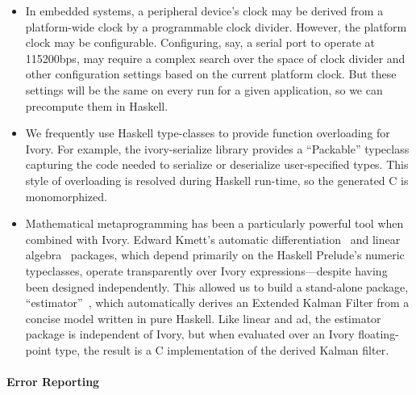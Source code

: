 \begin{itemize}
\item In embedded systems, a peripheral device's clock may be derived from a
  platform-wide clock by a programmable clock divider. However, the platform
  clock may be configurable. Configuring, say, a serial port to operate at
  115200bps, may require a complex search over the space of clock divider and
  other configuration settings based on the current platform clock. But these
  settings will be the same on every run for a given application, so we can
  precompute them in Haskell.
\item We frequently use Haskell type-classes to provide function overloading for
  Ivory. For example, the ivory-serialize library provides a ``Packable''
  typeclass capturing the code needed to serialize or deserialize user-specified
  types. This style of overloading is resolved during Haskell run-time, so the
  generated C is monomorphized.
\item Mathematical metaprogramming has been a particularly powerful tool when combined
with Ivory. Edward Kmett's automatic differentiation~\cite{ad} and linear
algebra~\cite{linear} packages, which depend primarily on the Haskell Prelude's
numeric typeclasses, operate transparently over Ivory expressions---despite
having been designed independently. This allowed us to build a stand-alone
package, ``estimator''~\cite{estimator}, which automatically derives an Extended
Kalman Filter from a concise model written in pure Haskell. Like linear and ad,
the estimator package is independent of Ivory, but when evaluated over an Ivory
floating-point type, the result is a C implementation of the derived Kalman
filter.
\end{itemize}

\paragraph{Error Reporting}

